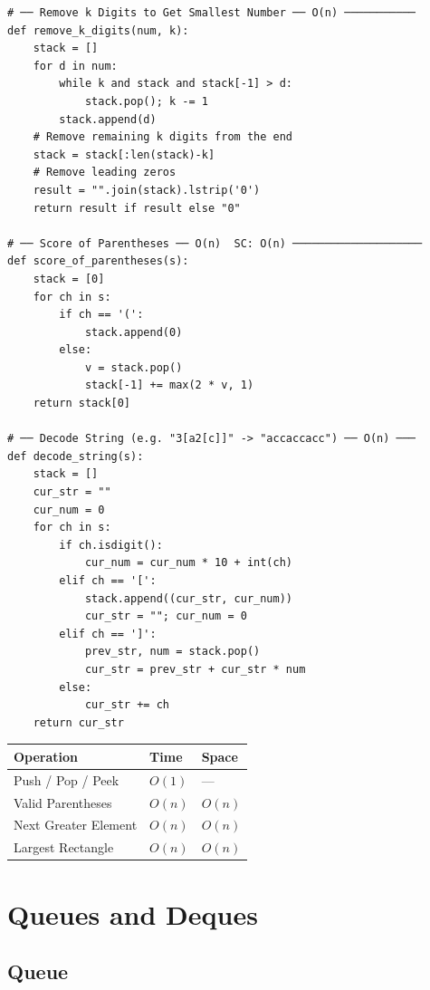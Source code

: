 \documentclass[11pt,a4paper]{report}
\begin{document}
\begin{lstlisting}
# ── Remove k Digits to Get Smallest Number ── O(n) ───────────
def remove_k_digits(num, k):
    stack = []
    for d in num:
        while k and stack and stack[-1] > d:
            stack.pop(); k -= 1
        stack.append(d)
    # Remove remaining k digits from the end
    stack = stack[:len(stack)-k]
    # Remove leading zeros
    result = "".join(stack).lstrip('0')
    return result if result else "0"

# ── Score of Parentheses ── O(n)  SC: O(n) ────────────────────
def score_of_parentheses(s):
    stack = [0]
    for ch in s:
        if ch == '(':
            stack.append(0)
        else:
            v = stack.pop()
            stack[-1] += max(2 * v, 1)
    return stack[0]

# ── Decode String (e.g. "3[a2[c]]" -> "accaccacc") ── O(n) ───
def decode_string(s):
    stack = []
    cur_str = ""
    cur_num = 0
    for ch in s:
        if ch.isdigit():
            cur_num = cur_num * 10 + int(ch)
        elif ch == '[':
            stack.append((cur_str, cur_num))
            cur_str = ""; cur_num = 0
        elif ch == ']':
            prev_str, num = stack.pop()
            cur_str = prev_str + cur_str * num
        else:
            cur_str += ch
    return cur_str
\end{lstlisting}

\begin{compbox}
\begin{tabular}{@{}lll@{}}
\toprule
\textbf{Operation} & \textbf{Time} & \textbf{Space} \\
\midrule
Push / Pop / Peek & $O(1)$ & --- \\
Valid Parentheses & $O(n)$ & $O(n)$ \\
Next Greater Element & $O(n)$ & $O(n)$ \\
Largest Rectangle & $O(n)$ & $O(n)$ \\
\bottomrule
\end{tabular}
\end{compbox}

\chapter{Queues and Deques}

\section{Queue}
\end{document}
